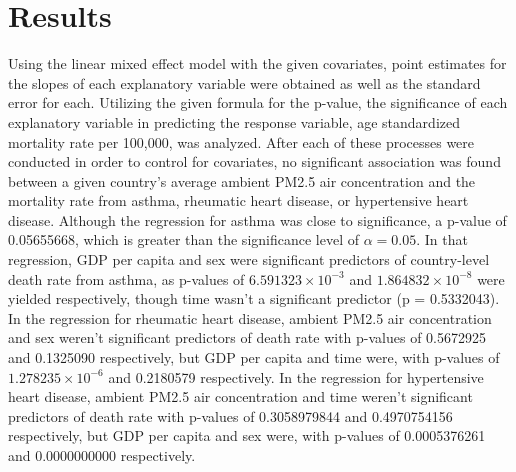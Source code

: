 \documentclass[12pt, letterpaper, twoside]{article}\usepackage[]{graphicx}\usepackage[]{xcolor}
\begin{document}
\section*{Results}
Using the linear mixed effect model with the given covariates, point estimates
for the slopes of each explanatory variable were obtained as well as the standard
error for each. Utilizing the given formula for the p-value, the significance of
each explanatory variable in predicting the response variable, age standardized
mortality rate per 100,000, was analyzed. After each of these processes were
conducted in order to control for covariates, no significant association was
found between a given country's average ambient PM2.5 air concentration and
the mortality rate from asthma, rheumatic heart disease, or hypertensive heart
disease. Although the regression for asthma was close to significance, a
p-value of 0.05655668, which is greater than the significance level of
\begin{math}\alpha = 0.05\end{math}. In that regression, GDP per capita and sex
were significant predictors of country-level death rate from asthma, as p-values
of \begin{math}6.591323\times10^{-3}\end{math} and
\begin{math}1.864832\times10^{-8}\end{math} were yielded respectively, though
time wasn't a significant predictor (p = 0.5332043). In the regression for
rheumatic heart disease, ambient PM2.5 air concentration and sex weren't
significant predictors of death rate with p-values of 0.5672925 and 0.1325090
respectively, but GDP per capita and time were, with p-values of
\begin{math}1.278235\times10^{-6}\end{math} and
0.2180579 respectively. In the regression for hypertensive heart disease,
ambient PM2.5 air concentration and time weren't significant predictors of death
rate with p-values of 0.3058979844 and 0.4970754156 respectively, but GDP per
capita and sex were, with p-values of 0.0005376261 and 0.0000000000 respectively.
\end{document}
